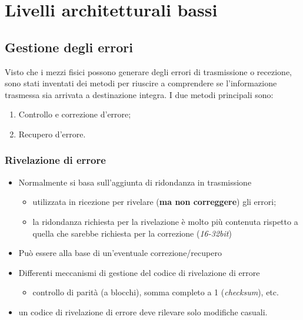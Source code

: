 \documentclass{book}
\begin{document}
\chapter{Livelli architetturali bassi}

\section{Gestione degli errori}
Visto che i mezzi fisici possono generare degli errori di trasmissione o
recezione, sono stati inventati dei metodi per riuscire a comprendere se
l'informazione trasmessa sia arrivata a destinazione integra. I due metodi
principali sono:
\begin{enumerate}
	\item Controllo e correzione d'errore;
	\item Recupero d'errore.
\end{enumerate}
\subsection{Rivelazione di errore}
\begin{itemize}
	\item Normalmente si basa sull'aggiunta di ridondanza in trasmissione
		\begin{itemize}
			\item utilizzata in ricezione per rivelare ({\bf ma non correggere})
				gli errori;
			\item la ridondanza richiesta per la rivelazione è molto più
				contenuta rispetto a quella che sarebbe richiesta per la
				correzione (\textit{16-32bit})
		\end{itemize}
	\item Può essere alla base di un'eventuale correzione/recupero
	\item Differenti meccanismi di gestione del codice di rivelazione di errore
		\begin{itemize}
			\item controllo di parità (a blocchi), somma completo a 1
				(\textit{checksum}), etc.
		\end{itemize}
	\item un codice di rivelazione di errore deve rilevare solo modifiche
		casuali.
\end{itemize}
\end{document}
